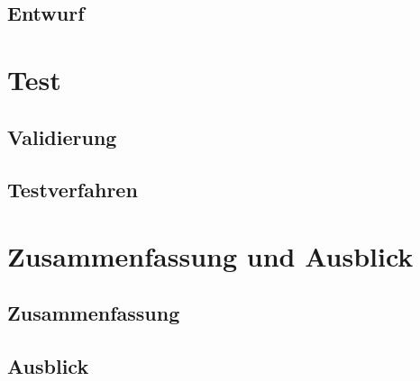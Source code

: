 \documentclass[10pt, a4paper]{scrreprt}
\begin{document}
\section{Entwurf}

\chapter{Test}
\section{Validierung}
\section{Testverfahren}

\chapter{Zusammenfassung und Ausblick}
\section{Zusammenfassung}
\section{Ausblick}
	






\printindex


\end{document}
